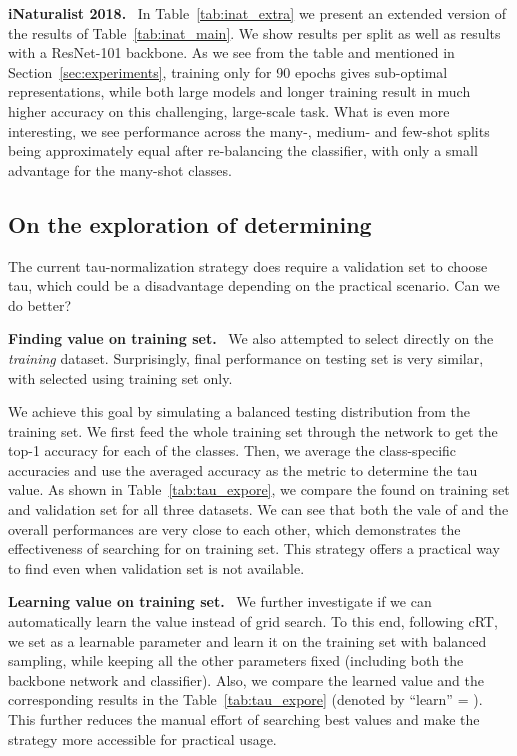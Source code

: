 \documentclass[dvipsnames]{article} \usepackage{iclr2020_conference, times}
\newcommand{\header}[1]{\noindent\textbf{#1.}~}
\begin{document}
\header{iNaturalist 2018} In Table~\ref{tab:inat_extra} we present an extended version of the results of Table~\ref{tab:inat_main}. We show results per split as well as results with a ResNet-101 backbone. As we see from the table and mentioned in Section~\ref{sec:experiments}, training only for 90 epochs gives sub-optimal representations, while both large models and longer training result in much higher accuracy on this challenging, large-scale task. What is even more interesting, we see performance across the many-, medium- and few-shot splits being approximately equal after re-balancing the classifier, with only a small advantage for the many-shot classes. 


\subsection{On the exploration of determining }
\label{sec:tau_selection}


The current tau-normalization strategy does require a validation set to choose tau, which could be a disadvantage depending on the practical scenario. Can we do better?

\header{Finding  value on training set}
We also attempted to select  directly on the \emph{training} dataset. Surprisingly, final performance on testing set is very similar, with  selected using training set only. 

We achieve this goal by simulating a balanced testing distribution from the training set. We first feed the whole training set through the network to get the top-1 accuracy for each of the classes. Then, we average the class-specific accuracies and use the averaged accuracy as the metric to determine the tau value. As shown in Table~\ref{tab:tau_expore}, we compare the  found on training set and validation set for all three datasets. We can see that both the vale of  and the overall performances are very close to each other, which demonstrates the effectiveness of searching for  on training set. This strategy offers a practical way to find  even when validation set is not available.

\header{Learning  value on training set}
We further investigate if we can automatically learn the  value instead of grid search. To this end, following cRT, we set  as a learnable parameter and learn it on the training set with balanced sampling, while keeping all the other parameters fixed (including both the backbone network and classifier). Also, we compare the learned  value and the corresponding results in the Table~\ref{tab:tau_expore} (denoted by ``learn'' = \cmark). This further reduces the manual effort of searching best  values and make the strategy more accessible for practical usage.
\end{document}
